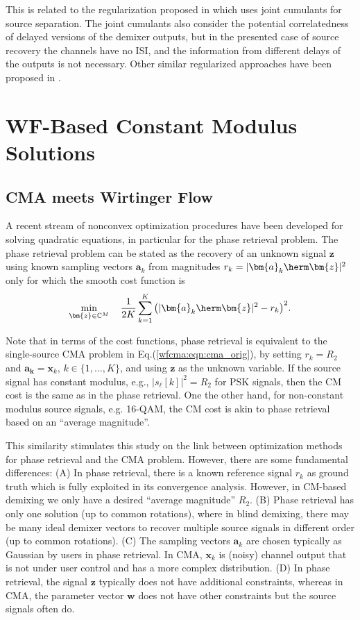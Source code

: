 This is related to the regularization proposed in \cite{Chen1991crimno} which uses joint cumulants for source separation. The joint cumulants also consider the potential correlatedness of delayed versions of the demixer outputs, but in the presented case of source recovery the channels have no ISI, and the information from different delays of the outputs is not necessary. Other similar regularized approaches have been proposed in \cite{Bessios1992mimocrimno,Li1998adaptivemimocma}.


\section{WF-Based Constant Modulus Solutions} \label{wfcma:WF}

\subsection{CMA meets Wirtinger Flow} 

A recent stream of nonconvex optimization procedures have been developed for solving quadratic equations, in particular for the phase retrieval problem. The phase retrieval problem can be stated as the recovery of an unknown signal $\bm{z}$ using known sampling vectors $\bm{a}_k$ from magnitudes $r_k=|\bm{a}_k\herm \bm{z}|^2$ only for which the smooth cost function is
\begin{equation}
\min_{\bm{z}\in\mathbb{C}^M}\quad \frac{1}{2K}\sum_{k=1}^K\big(|\bm{a}_k\herm\bm{z}|^2-r_k\big)^2. \label{wfcma:eqn:phaseretrieval}
\end{equation}

Note that in terms of the cost functions, phase retrieval is equivalent to the single-source CMA problem in Eq.(\ref{wfcma:eqn:cma_orig}), by setting $r_k=R_2$ and $\bm{a_k}=\bm{x}_k$, $k\in\{1,\ldots,K\}$, and using $\bm{z}$ as the unknown variable. 
If the source signal has constant modulus, e.g., $|s_{\ell}[k]|^2=R_2$ for PSK signals, then the CM cost is the same as in the phase retrieval. 
One the other hand, for non-constant modulus source signals, e.g. 16-QAM, the CM cost is akin to phase retrieval based on an ``average magnitude''.

This similarity stimulates this study on the link between optimization methods for phase retrieval and the CMA problem. 
However, there are some fundamental differences: 
(A) In phase retrieval, there is a known reference signal $r_k$ as ground truth which is fully exploited in its convergence analysis. However, in CM-based demixing we only have a desired ``average magnitude'' $R_2$.  
(B) Phase retrieval has only one solution (up to common rotations), where in blind demixing, there may be many ideal demixer vectors to recover multiple source signals in different order (up to common rotations). 
(C) The sampling vectors $\bm{a}_k$ are chosen typically as Gaussian by users in phase retrieval. In CMA, $\bm{x}_k$ is (noisy) channel output that is not under user control 
and has a more complex distribution. 
(D) In phase retrieval, the signal $\bm{z}$ typically does not have additional constraints, whereas in CMA, the parameter vector $\bm{w}$ does not have other constraints but the source signals often do. 


